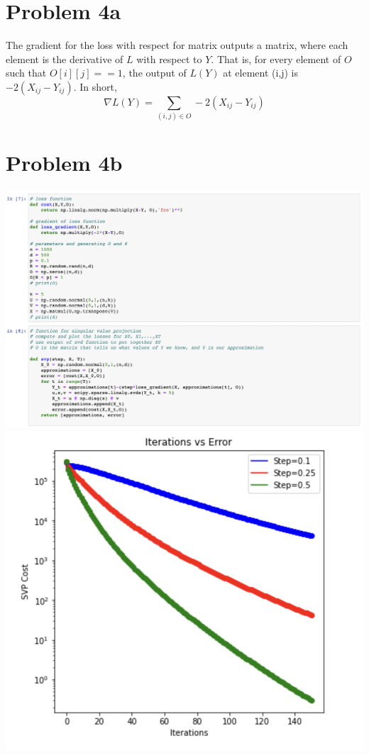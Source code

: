 \documentclass[12pt, letterpaper]{article}
\begin{document}
\newpage
\section{Problem 4a}
The gradient for the loss with respect for matrix outputs a matrix, where each element is the derivative of $L$ with respect to $Y$. That is, for every element of $O$ such that $O[i][j]==1$, the output of $L(Y)$ at element (i,j) is $-2(X_{ij}-Y_{ij})$. In short,
\[\nabla L(Y) = \sum_{(i,j)\in O}-2(X_{ij}-Y_{ij})\]

\newpage
\section{Problem 4b}
  \includegraphics[scale=0.5]{./img/4a}
  \includegraphics[scale=0.7]{./img/4b}
\end{document}
